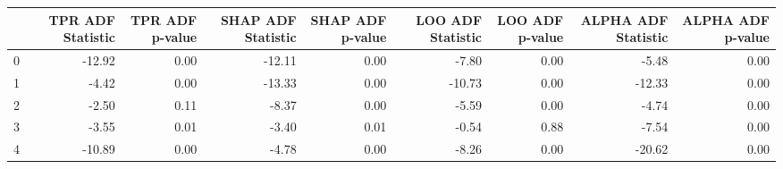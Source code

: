 \begin{tabular}{lrrrrrrrr}
\toprule
 & TPR ADF Statistic & TPR ADF p-value & SHAP ADF Statistic & SHAP ADF p-value & LOO ADF Statistic & LOO ADF p-value & ALPHA ADF Statistic & ALPHA ADF p-value \\
\midrule
0 & -12.92 & 0.00 & -12.11 & 0.00 & -7.80 & 0.00 & -5.48 & 0.00 \\
1 & -4.42 & 0.00 & -13.33 & 0.00 & -10.73 & 0.00 & -12.33 & 0.00 \\
2 & -2.50 & 0.11 & -8.37 & 0.00 & -5.59 & 0.00 & -4.74 & 0.00 \\
3 & -3.55 & 0.01 & -3.40 & 0.01 & -0.54 & 0.88 & -7.54 & 0.00 \\
4 & -10.89 & 0.00 & -4.78 & 0.00 & -8.26 & 0.00 & -20.62 & 0.00 \\
\bottomrule
\end{tabular}
